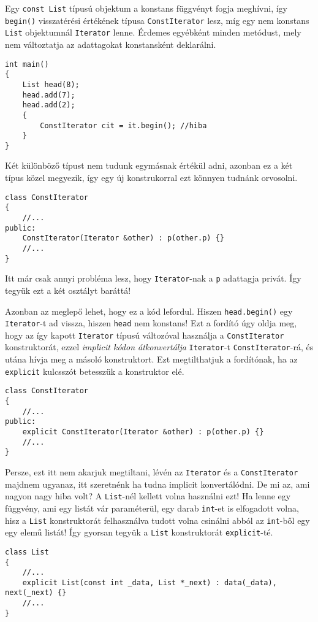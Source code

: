 \documentclass[a4paper,11.5pt]{article}
\begin{document}
	Egy \texttt{const List} típusú objektum a konstans függvényt fogja meghívni, így \texttt{begin()} visszatérési értékének típusa \texttt{ConstIterator} lesz, míg egy nem konstans \texttt{List} objektumnál \texttt{Iterator} lenne. Érdemes egyébként minden metódust, mely nem változtatja az adattagokat konstansként deklarálni. 
	\begin{lstlisting}
int main()
{
	List head(8);
	head.add(7);
	head.add(2);
	{
		ConstIterator cit = it.begin(); //hiba
	}
}
	\end{lstlisting}
	Két különböző típust nem tudunk egymásnak értékül adni, azonban ez a két típus közel megyezik, így egy új konstrukorral ezt könnyen tudnánk orvosolni.
	\begin{lstlisting}
class ConstIterator
{
	//...
public:
	ConstIterator(Iterator &other) : p(other.p) {}
	//...
}
	\end{lstlisting}
	Itt már csak annyi probléma lesz, hogy \texttt{Iterator}-nak a \texttt{p} adattagja privát. Így tegyük ezt a két osztályt baráttá!
	
	Azonban az meglepő lehet, hogy ez a kód lefordul. Hiszen \texttt{head.begin()} egy \texttt{Iterator}-t ad vissza, hiszen \texttt{head} nem konstans! Ezt a fordító úgy oldja meg, hogy az így kapott \texttt{Iterator} típusú változóval használja a \texttt{ConstIterator} konstruktorát, ezzel \textit{implicit kódon átkonvertálja} \texttt{Iterator}-t \texttt{ConstIterator}-rá, és utána hívja meg a másoló konstruktort. Ezt megtilthatjuk a fordítónak, ha az \texttt{explicit} kulcsszót betesszük a konstruktor elé.
\begin{lstlisting}
class ConstIterator
{
	//...
public:
	explicit ConstIterator(Iterator &other) : p(other.p) {}
	//...
}
\end{lstlisting}
	Persze, ezt itt nem akarjuk megtiltani, lévén az \texttt{Iterator} és a \texttt{ConstIterator} majdnem ugyanaz, itt szeretnénk ha tudna implicit konvertálódni. De mi az, ami nagyon nagy hiba volt? A \texttt{List}-nél kellett volna használni ezt! Ha lenne egy függvény, ami egy listát vár paraméterül, egy darab \texttt{int}-et is elfogadott volna, hisz a \texttt{List} konstruktorát felhasználva tudott volna csinálni abból az \texttt{int}-ből egy egy elemű listát! Így gyorsan tegyük a \texttt{List} konstruktorát \texttt{explicit}-té.
	\begin{lstlisting}
class List
{
	//...
	explicit List(const int _data, List *_next) : data(_data), next(_next) {}
	//...
}
	\end{lstlisting}
\end{document}
